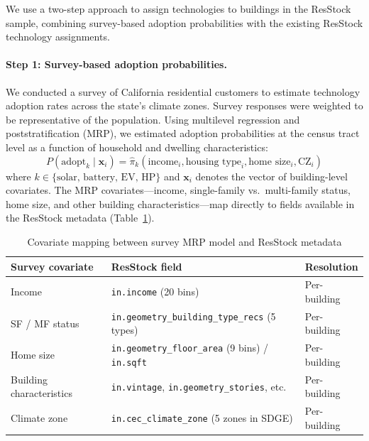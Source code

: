 We use a two-step approach to assign technologies to buildings in the ResStock sample, combining survey-based adoption probabilities with the existing ResStock technology assignments.

\paragraph{Step 1: Survey-based adoption probabilities.}
We conducted a survey of California residential customers to estimate technology adoption rates across the state's climate zones. Survey responses were weighted to be representative of the population. Using multilevel regression and poststratification (MRP), we estimated adoption probabilities at the census tract level as a function of household and dwelling characteristics:
\begin{equation}
P(\text{adopt}_k \mid \mathbf{x}_i) = \hat{\pi}_{k}(\text{income}_i, \text{housing type}_i, \text{home size}_i, \text{CZ}_i)
\end{equation}
where $k \in \{\text{solar, battery, EV, HP}\}$ and $\mathbf{x}_i$ denotes the vector of building-level covariates. The MRP covariates---income, single-family vs.\ multi-family status, home size, and other building characteristics---map directly to fields available in the ResStock metadata (Table~\ref{tab:covariate_mapping}).

\begin{table}[htbp]
\centering
\caption{Covariate mapping between survey MRP model and ResStock metadata}
\label{tab:covariate_mapping}
\begin{tabular}{lll}
\toprule
Survey covariate & ResStock field & Resolution \\
\midrule
Income & \texttt{in.income} (20 bins) & Per-building \\
SF / MF status & \texttt{in.geometry\_building\_type\_recs} (5 types) & Per-building \\
Home size & \texttt{in.geometry\_floor\_area} (9 bins) / \texttt{in.sqft} & Per-building \\
Building characteristics & \texttt{in.vintage}, \texttt{in.geometry\_stories}, etc. & Per-building \\
Climate zone & \texttt{in.cec\_climate\_zone} (5 zones in SDGE) & Per-building \\
\bottomrule
\end{tabular}
\end{table}


